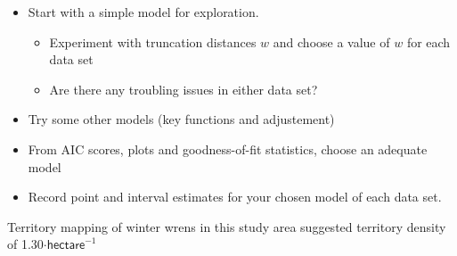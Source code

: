 \documentclass[a4paper, 10pt]{article}
\begin{document}
\begin{itemize}
	\item Start with a simple model for exploration.
	\begin{itemize}
		\item Experiment with truncation distances $w$ and choose a value of $w$ for each data set
		\item Are there any troubling issues in either data set?
	\end{itemize}
%
{%
}

	\item Try some other models (key functions and adjustement)
	\item From AIC scores, plots and goodness-of-fit statistics, choose an adequate model
	\item Record point and interval estimates for your chosen model of each data set.
\end{itemize}

Territory mapping of winter wrens in this study area suggested territory density of 1.30$\cdot \textsf{hectare}^{-1}$
\end{document}
